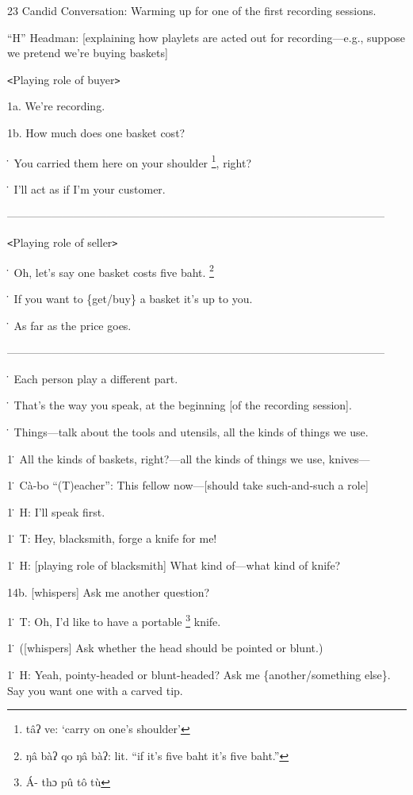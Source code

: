 
23 Candid Conversation: Warming up for one of the first recording sessions.

``H'' Headman: [explaining how playlets are acted out for recording---e.g., suppose
we pretend we're buying baskets]

\texttt{<}Playing role of buyer\texttt{>}

1a. We're recording.

1b. How much does one basket cost?

\. You carried them here on your shoulder \footnote{tâʔ ve: `carry on one's shoulder'}, right?

\. I'll act as if I'm your customer.

------------------------------------------------------------------------------------------------------

\texttt{<}Playing role of seller\texttt{>}

\. Oh, let's say one basket costs five baht. \footnote{ŋâ bàʔ qo ŋâ bàʔ: lit. ``if it's five baht it's five baht.''}

\. If you want to \{get/buy\} a basket it's up to you.

\. As far as the price goes.

------------------------------------------------------------------------------------------------------

\. Each person play a different part.

\. That's the way you speak, at the beginning [of the recording session].

\. Things---talk about the tools and utensils, all the kinds of things we use.

1\. All the kinds of baskets, right?---all the kinds of things we use, knives---

1\. Cà-bo ``(T)eacher'': This fellow now---[should take such-and-such a role]

1\. H: I'll speak first.

1\. T: Hey, blacksmith, forge a knife for me!

1\. H: [playing role of blacksmith] What kind of---what kind of knife?

14b. [whispers] Ask me another question?

1\. T: Oh, I'd like to have a portable \footnote{Á- thɔ pû tô  tù} knife.

1\.  ([whispers] Ask whether the head should be pointed or blunt.)

1\. H: Yeah, pointy-headed or blunt-headed?  Ask me \{another/something else\}.
Say you want one with a carved tip.

